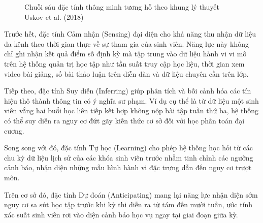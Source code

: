 \begin{figure}[htbp]
\centering
{}
\caption{Chuỗi sáu đặc tính thông minh tương hỗ theo khung lý thuyết Uskov et al. (2018)}
\label{fig:six_features}
\end{figure}

Trước hết, đặc tính Cảm nhận (Sensing) đại diện cho khả năng thu nhận dữ liệu đa kênh theo thời gian thực về sự tham gia của sinh viên. Năng lực này không chỉ ghi nhận kết quả điểm số định kỳ mà tập trung vào dữ liệu hành vi vi mô trên hệ thống quản trị học tập như tần suất truy cập học liệu, thời gian xem video bài giảng, số bài thảo luận trên diễn đàn và dữ liệu chuyên cần trên lớp. 

Tiếp theo, đặc tính Suy diễn (Inferring) giúp phân tích và bối cảnh hóa các tín hiệu thô thành thông tin có ý nghĩa sư phạm. Ví dụ cụ thể là từ dữ liệu một sinh viên vắng hai buổi học liên tiếp kết hợp không nộp bài tập tuần thứ ba, hệ thống có thể suy diễn ra nguy cơ đứt gãy kiến thức cơ sở đối với học phần toán đại cương. 

Song song với đó, đặc tính Tự học (Learning) cho phép hệ thống học hỏi từ các chu kỳ dữ liệu lịch sử của các khóa sinh viên trước nhằm tinh chỉnh các ngưỡng cảnh báo, nhận diện những mẫu hình hành vi đặc trưng dẫn đến nguy cơ trượt môn. 

Trên cơ sở đó, đặc tính Dự đoán (Anticipating) mang lại năng lực nhận diện sớm nguy cơ sa sút học tập trước khi kỳ thi diễn ra từ tám đến mười tuần, ước tính xác suất sinh viên rơi vào diện cảnh báo học vụ ngay tại giai đoạn giữa kỳ. 

